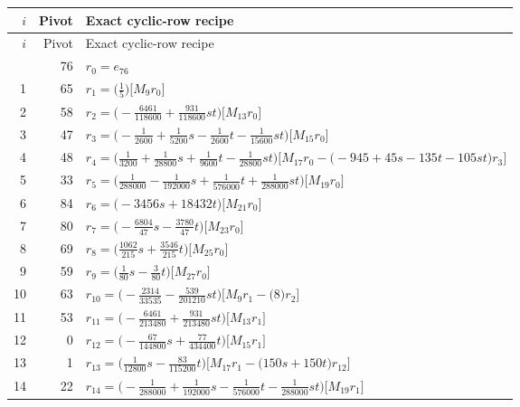 \begingroup\footnotesize\setlength{\lineskip}{2pt}\setlength{\lineskiplimit}{2pt}
\setlength{\tabcolsep}{5pt}
\begin{longtable}{@{}rrP{.80\linewidth}@{}}
\toprule
$i$ & Pivot & Exact cyclic-row recipe\\
\midrule\endfirsthead
\toprule
$i$ & Pivot & Exact cyclic-row recipe\\
\midrule\endhead
\bottomrule{} & 76 & $r_{0}=e_{76}$\\
1 & 65 & $r_{1}=\bigl(\frac{1}{5}\bigr)\bigl[M_{9}r_{0}\bigr]$\\
2 & 58 & $r_{2}=\bigl(-\frac{6461}{118600}+\allowbreak \frac{931}{118600}st\bigr)\bigl[M_{13}r_{0}\bigr]$\\
3 & 47 & $r_{3}=\bigl(-\frac{1}{2600}+\allowbreak \frac{1}{5200}s-\frac{1}{2600}t-\frac{1}{15600}st\bigr)\bigl[M_{15}r_{0}\bigr]$\\
4 & 48 & $r_{4}=\bigl(\frac{1}{3200}+\allowbreak \frac{1}{28800}s+\allowbreak \frac{1}{9600}t-\frac{1}{28800}st\bigr)\bigl[M_{17}r_{0}-\allowbreak \bigl(-945+\allowbreak 45s-135t-105st\bigr)r_{3}\bigr]$\\
5 & 33 & $r_{5}=\bigl(\frac{1}{288000}-\frac{1}{192000}s+\allowbreak \frac{1}{576000}t+\allowbreak \frac{1}{288000}st\bigr)\bigl[M_{19}r_{0}\bigr]$\\
6 & 84 & $r_{6}=\bigl(-3456s+\allowbreak 18432t\bigr)\bigl[M_{21}r_{0}\bigr]$\\
7 & 80 & $r_{7}=\bigl(-\frac{6804}{47}s-\frac{3780}{47}t\bigr)\bigl[M_{23}r_{0}\bigr]$\\
8 & 69 & $r_{8}=\bigl(\frac{1062}{215}s+\allowbreak \frac{3546}{215}t\bigr)\bigl[M_{25}r_{0}\bigr]$\\
9 & 59 & $r_{9}=\bigl(\frac{1}{80}s-\frac{3}{80}t\bigr)\bigl[M_{27}r_{0}\bigr]$\\
10 & 63 & $r_{10}=\bigl(-\frac{2314}{33535}-\frac{539}{201210}st\bigr)\bigl[M_{9}r_{1}-\allowbreak \bigl(8\bigr)r_{2}\bigr]$\\
11 & 53 & $r_{11}=\bigl(-\frac{6461}{213480}+\allowbreak \frac{931}{213480}st\bigr)\bigl[M_{13}r_{1}\bigr]$\\
12 & 0 & $r_{12}=\bigl(-\frac{67}{144800}s+\allowbreak \frac{77}{434400}t\bigr)\bigl[M_{15}r_{1}\bigr]$\\
13 & 1 & $r_{13}=\bigl(\frac{1}{12800}s-\frac{83}{115200}t\bigr)\bigl[M_{17}r_{1}-\allowbreak \bigl(150s+\allowbreak 150t\bigr)r_{12}\bigr]$\\
14 & 22 & $r_{14}=\bigl(-\frac{1}{288000}+\allowbreak \frac{1}{192000}s-\frac{1}{576000}t-\frac{1}{288000}st\bigr)\bigl[M_{19}r_{1}\bigr]$\\

\end{longtable}
